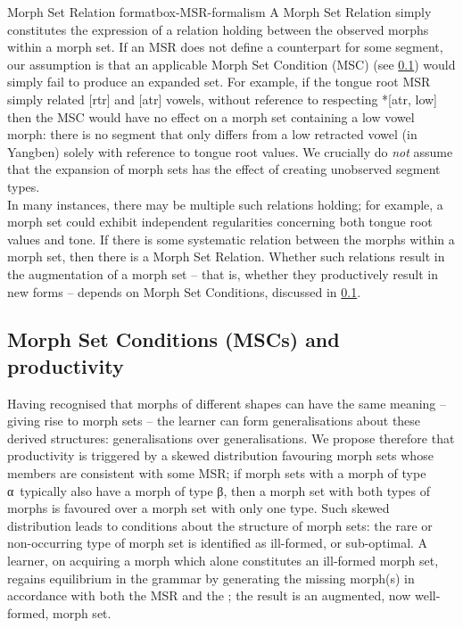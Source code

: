 \begin{dadpbox}{Morph Set Relation format}{box-MSR-formalism}
A Morph Set Relation simply constitutes the expression of a relation holding between the observed morphs within a morph set. If an MSR does not define a counterpart for some segment, our assumption is that an applicable Morph Set Condition (MSC) (see \textsection\ref{section_MSCs}) would simply fail to produce an expanded set. For example, if the tongue root MSR simply related [rtr] and [atr] vowels, without reference to respecting *[atr, low] then the MSC would have no effect on a morph set containing a low vowel morph: there is no segment that only differs from a low retracted vowel (in Yangben) solely with reference to tongue root values. We crucially do {\it not} assume that the expansion of morph sets has the effect of creating unobserved segment types.\\

In many instances, there may be multiple such relations holding; for example, a morph set could exhibit independent regularities concerning both tongue root values and tone. If there is some systematic relation between the morphs within a morph set, then there is a Morph Set Relation. Whether such relations result in the augmentation of a morph set -- that is, whether they productively result in new forms -- depends on Morph Set Conditions, discussed in \textsection\ref{section_MSCs}.

\end{dadpbox}
 

\subsection{Morph Set Conditions (MSCs) and productivity} \label{section_MSCs}

Having recognised that morphs of different shapes can have the same meaning -- giving rise to morph sets -- the learner can form generalisations about these derived structures: generalisations over generalisations. We propose therefore that productivity is triggered by a skewed distribution favouring morph sets whose members are consistent with some MSR; if morph sets with a morph of type α\ typically also have a morph of type β, then a morph set with both types of morphs is favoured over a morph set with only one type. Such skewed distribution leads to conditions about the structure of morph sets: the rare or non-occurring type of morph set is identified as ill-formed, or sub-optimal. A learner, on acquiring a morph which alone constitutes an ill-formed morph set, regains equilibrium in the grammar by generating the missing morph(s) in accordance with both the MSR and the \Identity; the result is an augmented, now well-formed, morph set.

